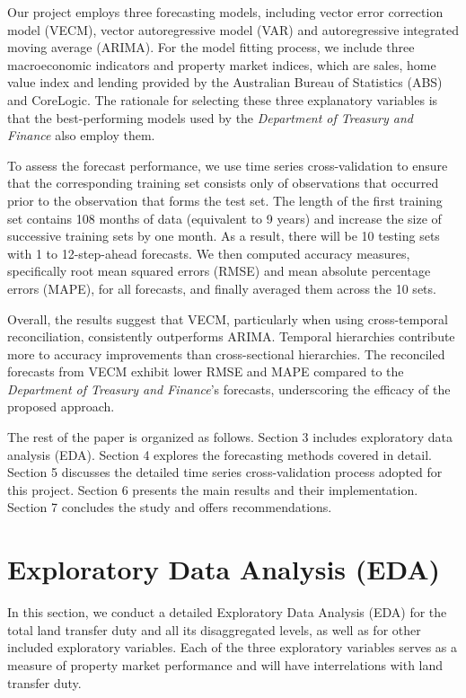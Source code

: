 \documentclass[
  11pt,
  a4paper,
]{article}
\begin{document}
Our project employs three forecasting models, including vector error
correction model (VECM), vector autoregressive model (VAR) and
autoregressive integrated moving average (ARIMA). For the model fitting
process, we include three macroeconomic indicators and property market
indices, which are sales, home value index and lending provided by the
Australian Bureau of Statistics (ABS) and CoreLogic. The rationale for
selecting these three explanatory variables is that the best-performing
models used by the \emph{Department of Treasury and Finance} also employ
them.

To assess the forecast performance, we use time series cross-validation
to ensure that the corresponding training set consists only of
observations that occurred prior to the observation that forms the test
set. The length of the first training set contains 108 months of data
(equivalent to 9 years) and increase the size of successive training
sets by one month. As a result, there will be 10 testing sets with 1 to
12-step-ahead forecasts. We then computed accuracy measures,
specifically root mean squared errors (RMSE) and mean absolute
percentage errors (MAPE), for all forecasts, and finally averaged them
across the 10 sets.

Overall, the results suggest that VECM, particularly when using
cross-temporal reconciliation, consistently outperforms ARIMA. Temporal
hierarchies contribute more to accuracy improvements than
cross-sectional hierarchies. The reconciled forecasts from VECM exhibit
lower RMSE and MAPE compared to the \emph{Department of Treasury and
Finance}'s forecasts, underscoring the efficacy of the proposed
approach.

The rest of the paper is organized as follows. Section 3 includes
exploratory data analysis (EDA). Section 4 explores the forecasting
methods covered in detail. Section 5 discusses the detailed time series
cross-validation process adopted for this project. Section 6 presents
the main results and their implementation. Section 7 concludes the study
and offers recommendations.

\section{Exploratory Data Analysis
(EDA)}\label{exploratory-data-analysis-eda}

In this section, we conduct a detailed Exploratory Data Analysis (EDA)
for the total land transfer duty and all its disaggregated levels, as
well as for other included exploratory variables. Each of the three
exploratory variables serves as a measure of property market performance
and will have interrelations with land transfer duty.
\end{document}
